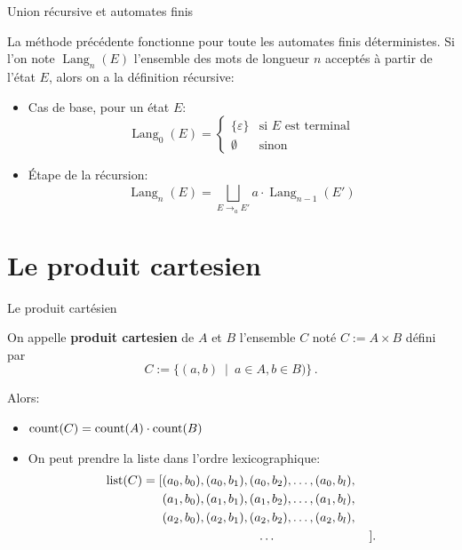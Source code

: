 \documentclass{beamer}
\begin{document}
\begin{frame}{Union récursive et automates finis}

  \begin{NOTE}
    La méthode précédente fonctionne pour toute les automates finis
    déterministes. Si l'on note $\operatorname{Lang}_n(E)$ l'ensemble des mots
    de longueur $n$ acceptés à partir de l'état $E$, alors on a la définition
    récursive:
    \begin{itemize}
    \item Cas de base, pour un état $E$:
      \[
      \operatorname{Lang}_0(E) =
      \begin{cases}
        \{\varepsilon\} & \text{si $E$ est terminal} \\
        \emptyset & \text{sinon}
      \end{cases}
      \]
    \item Étape de la récursion:
      \[
      \operatorname{Lang}_n(E) = \bigsqcup_{E\rightarrow_a E'} a\cdot
      \operatorname{Lang}_{n-1}(E')
      \]
    \end{itemize}
  \end{NOTE}
\end{frame}

\section{Le produit cartesien}
\begin{frame}{Le produit cartésien}

  \begin{definition}
    On appelle \textbf{produit cartesien} de $A$ et $B$ l'ensemble $C$ noté 
    $C:=A\times B$ défini par
    $$C := \{(a,b)\ \mid\ a\in A, b\in B)\}\,.$$
  \end{definition}
  \pause\bigskip

  Alors:
  \begin{itemize}
  \item $\operatorname{count}(C) = \operatorname{count}(A)\cdot\operatorname{count}(B)$
  \item On peut prendre la liste dans l'ordre lexicographique:
    \begin{align*}
      \operatorname{list}(C) = [&(a_0, b_0), (a_0, b_1), (a_0, b_2),\dots, (a_0, b_l),\\
                  &(a_1, b_0), (a_1, b_1), (a_1, b_2),\dots, (a_1, b_l),\\
                  &(a_2, b_0), (a_2, b_1), (a_2, b_2),\dots, (a_2, b_l),\\
                  &\hspace{2.7cm}\dots\hspace{2.7cm}].
    \end{align*}
  \end{itemize}
\end{frame}
\end{document}
